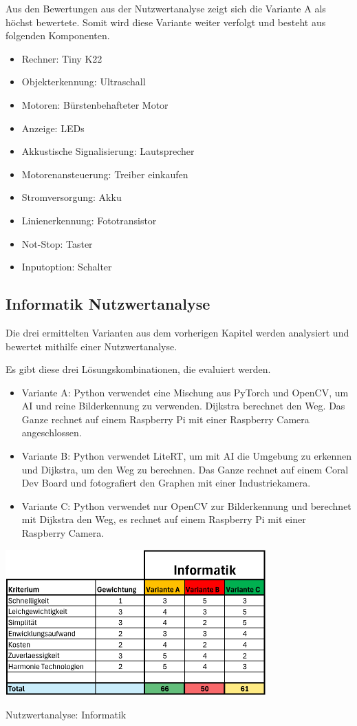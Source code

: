 Aus den Bewertungen aus der Nutzwertanalyse zeigt sich die Variante A als höchst bewertete. Somit wird diese Variante weiter verfolgt und besteht aus folgenden Komponenten.

\begin{itemize}
    \item Rechner: Tiny K22
    \item Objekterkennung: Ultraschall
    \item Motoren: Bürstenbehafteter Motor
    \item Anzeige: LEDs 
    \item Akkustische Signalisierung: Lautsprecher
    \item Motorenansteuerung: Treiber einkaufen
    \item Stromversorgung: Akku
    \item Linienerkennung: Fototransistor
    \item Not-Stop: Taster
    \item Inputoption: Schalter
\end{itemize}

\subsection{Informatik Nutzwertanalyse}

Die drei ermittelten Varianten aus dem vorherigen Kapitel werden analysiert und bewertet mithilfe einer Nutzwertanalyse.

Es gibt diese drei Lösungskombinationen, die evaluiert werden.

\begin{itemize}
     \item Variante A: Python verwendet eine Mischung aus PyTorch und OpenCV, um AI und reine Bilderkennung zu verwenden. Dijkstra berechnet den Weg. Das Ganze rechnet auf einem Raspberry Pi mit einer Raspberry Camera angeschlossen.
    \item  Variante B: Python verwendet LiteRT, um mit AI die Umgebung zu erkennen und Dijkstra, um den Weg zu berechnen. Das Ganze rechnet auf einem Coral Dev Board und fotografiert den Graphen mit einer Industriekamera.
    \item Variante C: Python verwendet nur OpenCV zur Bilderkennung und berechnet mit Dijkstra den Weg, es rechnet auf einem Raspberry Pi mit einer Raspberry Camera.
\end{itemize}

\begin{table}[H]
\centering
\includegraphics[width=0.75\textwidth]{assets/Nutzwertanalyse-I.pdf}
\caption{Nutzwertanalyse: Informatik}
\label{table:nutzwert-informatik}
\end{table}

